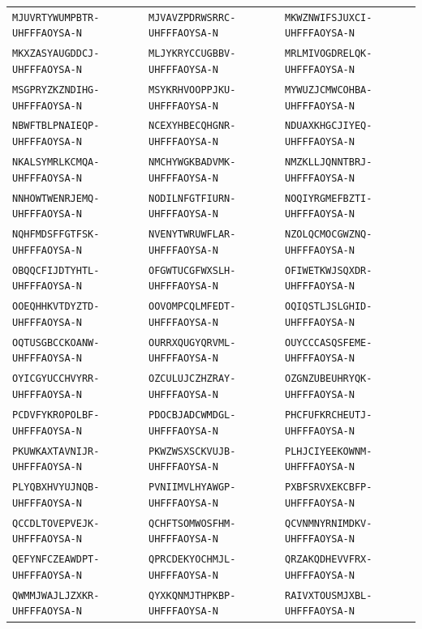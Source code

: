 {\begin{longtable}{@{}lll@{}}
\texttt{MJUVRTYWUMPBTR-UHFFFAOYSA-N} & \texttt{MJVAVZPDRWSRRC-UHFFFAOYSA-N} & \texttt{MKWZNWIFSJUXCI-UHFFFAOYSA-N} \\
\texttt{MKXZASYAUGDDCJ-UHFFFAOYSA-N} & \texttt{MLJYKRYCCUGBBV-UHFFFAOYSA-N} & \texttt{MRLMIVOGDRELQK-UHFFFAOYSA-N} \\
\texttt{MSGPRYZKZNDIHG-UHFFFAOYSA-N} & \texttt{MSYKRHVOOPPJKU-UHFFFAOYSA-N} & \texttt{MYWUZJCMWCOHBA-UHFFFAOYSA-N} \\
\texttt{NBWFTBLPNAIEQP-UHFFFAOYSA-N} & \texttt{NCEXYHBECQHGNR-UHFFFAOYSA-N} & \texttt{NDUAXKHGCJIYEQ-UHFFFAOYSA-N} \\
\texttt{NKALSYMRLKCMQA-UHFFFAOYSA-N} & \texttt{NMCHYWGKBADVMK-UHFFFAOYSA-N} & \texttt{NMZKLLJQNNTBRJ-UHFFFAOYSA-N} \\
\texttt{NNHOWTWENRJEMQ-UHFFFAOYSA-N} & \texttt{NODILNFGTFIURN-UHFFFAOYSA-N} & \texttt{NOQIYRGMEFBZTI-UHFFFAOYSA-N} \\
\texttt{NQHFMDSFFGTFSK-UHFFFAOYSA-N} & \texttt{NVENYTWRUWFLAR-UHFFFAOYSA-N} & \texttt{NZOLQCMOCGWZNQ-UHFFFAOYSA-N} \\
\texttt{OBQQCFIJDTYHTL-UHFFFAOYSA-N} & \texttt{OFGWTUCGFWXSLH-UHFFFAOYSA-N} & \texttt{OFIWETKWJSQXDR-UHFFFAOYSA-N} \\
\texttt{OOEQHHKVTDYZTD-UHFFFAOYSA-N} & \texttt{OOVOMPCQLMFEDT-UHFFFAOYSA-N} & \texttt{OQIQSTLJSLGHID-UHFFFAOYSA-N} \\
\texttt{OQTUSGBCCKOANW-UHFFFAOYSA-N} & \texttt{OURRXQUGYQRVML-UHFFFAOYSA-N} & \texttt{OUYCCCASQSFEME-UHFFFAOYSA-N} \\
\texttt{OYICGYUCCHVYRR-UHFFFAOYSA-N} & \texttt{OZCULUJCZHZRAY-UHFFFAOYSA-N} & \texttt{OZGNZUBEUHRYQK-UHFFFAOYSA-N} \\
\texttt{PCDVFYKROPOLBF-UHFFFAOYSA-N} & \texttt{PDOCBJADCWMDGL-UHFFFAOYSA-N} & \texttt{PHCFUFKRCHEUTJ-UHFFFAOYSA-N} \\
\texttt{PKUWKAXTAVNIJR-UHFFFAOYSA-N} & \texttt{PKWZWSXSCKVUJB-UHFFFAOYSA-N} & \texttt{PLHJCIYEEKOWNM-UHFFFAOYSA-N} \\
\texttt{PLYQBXHVYUJNQB-UHFFFAOYSA-N} & \texttt{PVNIIMVLHYAWGP-UHFFFAOYSA-N} & \texttt{PXBFSRVXEKCBFP-UHFFFAOYSA-N} \\
\texttt{QCCDLTOVEPVEJK-UHFFFAOYSA-N} & \texttt{QCHFTSOMWOSFHM-UHFFFAOYSA-N} & \texttt{QCVNMNYRNIMDKV-UHFFFAOYSA-N} \\
\texttt{QEFYNFCZEAWDPT-UHFFFAOYSA-N} & \texttt{QPRCDEKYOCHMJL-UHFFFAOYSA-N} & \texttt{QRZAKQDHEVVFRX-UHFFFAOYSA-N} \\
\texttt{QWMMJWAJLJZXKR-UHFFFAOYSA-N} & \texttt{QYXKQNMJTHPKBP-UHFFFAOYSA-N} & \texttt{RAIVXTOUSMJXBL-UHFFFAOYSA-N} \\

\end{longtable}}
